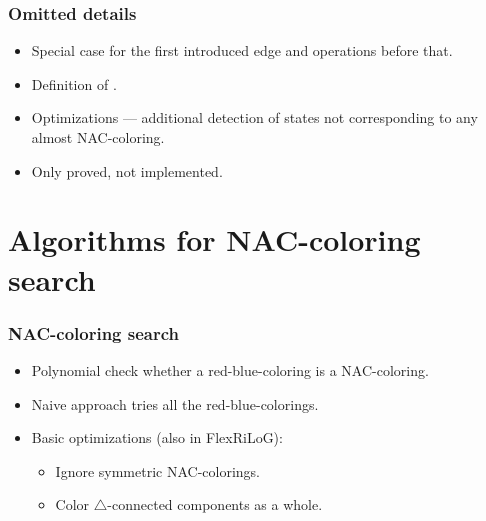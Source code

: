 \documentclass[aspectratio=\myaspectratio]{beamer}
\begin{document}
\begin{frame}
	\frametitle{Omitted details}

	\begin{itemize}
		\item
		      Special case for the first introduced edge and operations before that.
		\item
		      Definition of \IntroduceVertexWithEdgesNode{}.
		\item
		      Optimizations --- additional detection of states not corresponding
		      to any almost NAC-coloring.
		\item
		      Only proved, not implemented.
	\end{itemize}
\end{frame}

\section{Algorithms for NAC-coloring search}

\begin{frame}
	\frametitle{NAC-coloring search}
	\begin{itemize}
		\item
		      Polynomial check whether a red-blue-coloring is a NAC-coloring.
		\item
		      Naive approach tries all the red-blue-colorings.
		\item
		      Basic optimizations (also in FlexRiLoG):
		      \begin{itemize}
			      \item
			            Ignore symmetric NAC-colorings.
			      \item
			            Color \( \triangle \)-connected components as a whole.
		      \end{itemize}
	\end{itemize}
\end{frame}
\end{document}
